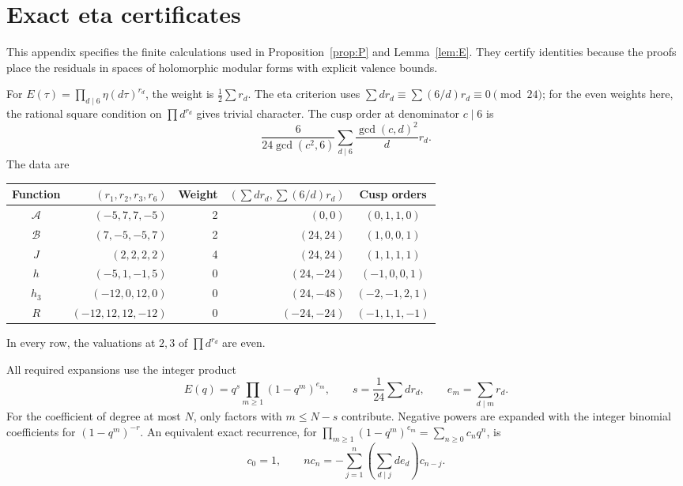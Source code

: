 \documentclass[11pt,a4paper]{article}
\theoremstyle{remark}\newtheorem{remark}[theorem]{Remark}
\newcommand{\A}{\mathcal A}\newcommand{\B}{\mathcal B}
\begin{document}
\appendix
\section{Exact eta certificates}\label{app:certificates}
This appendix specifies the finite calculations used in
Proposition~\ref{prop:P} and Lemma~\ref{lem:E}.
They certify identities because the proofs place the residuals in spaces
of holomorphic modular forms with explicit valence bounds.

For $E(\tau)=\prod_{d\mid6}\eta(d\tau)^{r_d}$,
the weight is $\tfrac12\sum r_d$. The eta criterion uses
$\sum dr_d\equiv\sum(6/d)r_d\equiv0\pmod{24}$; for the even weights
here, the rational square condition on $\prod d^{r_d}$ gives trivial
character. The cusp order at denominator $c\mid6$ is
\begin{equation}\label{eq:Ligozat}
 \frac6{24\gcd(c^2,6)}
 \sum_{d\mid6}\frac{\gcd(c,d)^2}{d}r_d.
\end{equation}
The data are
\begin{center}\small
\begin{tabular}{c r r r c}
\toprule
Function&$(r_1,r_2,r_3,r_6)$&Weight&$(\sum dr_d,\sum(6/d)r_d)$
 &Cusp orders\\\midrule
$\A$&$(-5,7,7,-5)$&2&$(0,0)$&$(0,1,1,0)$\\
$\B$&$(7,-5,-5,7)$&2&$(24,24)$&$(1,0,0,1)$\\
$J$&$(2,2,2,2)$&4&$(24,24)$&$(1,1,1,1)$\\
$h$&$(-5,1,-1,5)$&0&$(24,-24)$&$(-1,0,0,1)$\\
$h_3$&$(-12,0,12,0)$&0&$(24,-48)$&$(-2,-1,2,1)$\\
$R$&$(-12,12,12,-12)$&0&$(-24,-24)$&$(-1,1,1,-1)$\\
\bottomrule
\end{tabular}
\end{center}
In every row, the valuations at $2,3$ of $\prod d^{r_d}$ are even.

All required expansions use the integer product
\begin{equation}\label{eq:eta-product-algorithm}
 E(q)=q^s\prod_{m\ge1}(1-q^m)^{e_m},\qquad
 s=\frac1{24}\sum dr_d,\qquad e_m=\sum_{d\mid m}r_d.
\end{equation}
For the coefficient of degree at most $N$, only factors with
$m\le N-s$ contribute. Negative powers are expanded with the integer
binomial coefficients for $(1-q^m)^{-r}$.
An equivalent exact recurrence, for
$\prod_{m\ge1}(1-q^m)^{e_m}=\sum_{n\ge0}c_nq^n$, is
\begin{equation}\label{eq:eta-recurrence-algorithm}
 c_0=1,\qquad
 n c_n=-\sum_{j=1}^n\left(\sum_{d\mid j}d e_d\right)c_{n-j}.
\end{equation}
\end{document}
